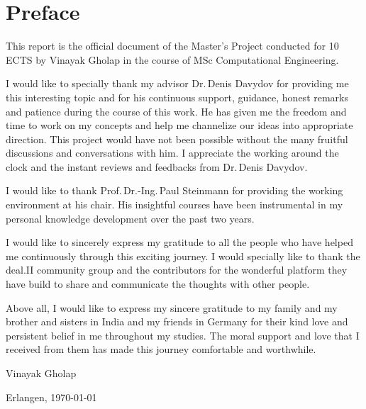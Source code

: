 \chapter*{Preface}
\indent This report is the official document of the Master's Project conducted for 10 ECTS by Vinayak Gholap in the course of MSc Computational Engineering. \par
I would like to specially thank my advisor Dr.\,Denis Davydov for providing me this interesting topic and for his continuous support, guidance, honest remarks and patience during the course of this work. He has given me the freedom and time to work on my concepts and help me channelize our ideas into appropriate direction. This project would have not been possible without the many fruitful discussions and conversations with him. I appreciate the working around the clock and the instant reviews and feedbacks from Dr.\,Denis Davydov. \par  
I would like to thank Prof.\,Dr.-Ing.\,Paul Steinmann for providing the working environment at his chair. His insightful courses have been instrumental in my personal knowledge development over the past two years. \par 
I would like to sincerely express my gratitude to all the people who have helped me continuously through this exciting journey. I would specially like to thank the deal.II community group and the contributors for the wonderful platform they have build to share and communicate the thoughts with other people.  \par 
Above all, I would like to express my sincere gratitude to my family and my brother and sisters in India and my friends in Germany for their kind love and persistent belief in me throughout my studies. The moral support and love that I received from them has made this journey comfortable and worthwhile. \newline\par 

\noindent Vinayak Gholap \par 
\noindent Erlangen, \today
